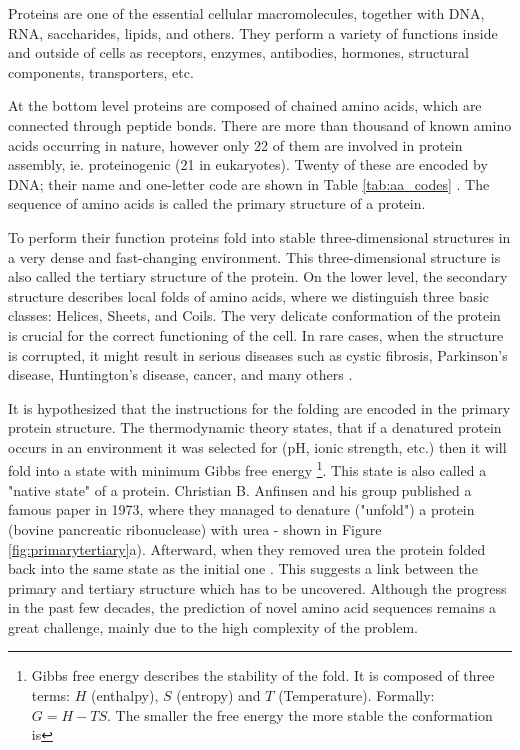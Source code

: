 Proteins are one of the essential cellular macromolecules, together with DNA, RNA, saccharides, lipids, and others.
They perform a variety of functions inside and outside of cells as receptors, enzymes, antibodies, hormones, structural components, transporters, etc. 

At the bottom level proteins are composed of chained amino acids, which are connected through peptide bonds. 
There are more than thousand of known amino acids occurring in nature, however only 22 of them are involved in protein assembly, ie. proteinogenic (21 in eukaryotes). 
Twenty of these are encoded by DNA; their name and one-letter code are shown in Table \ref{tab:aa_codes} \cite{protgenaa}. 
The sequence of amino acids is called the primary structure of a protein.

To perform their function proteins fold into stable three-dimensional structures in a very dense and fast-changing environment.
This three-dimensional structure is also called the tertiary structure of the protein. 
On the lower level, the secondary structure describes local folds of amino acids, where we distinguish three basic classes: Helices, Sheets, and Coils.
The very delicate conformation of the protein is crucial for the correct functioning of the cell.
In rare cases, when the structure is corrupted, it might result in serious diseases such as cystic fibrosis, Parkinson's disease, Huntington's disease, cancer, and many others \cite{protein_misfolding_diseases}.

It is hypothesized that the instructions for the folding are encoded in the primary protein structure. 
The thermodynamic theory states, that if a denatured protein occurs in an environment it was selected for (pH, ionic strength, etc.) then it will fold into a state with minimum Gibbs free energy \footnote{Gibbs free energy describes the stability of the fold. It is composed of three terms: $H$ (enthalpy), $S$ (entropy) and $T$ (Temperature). Formally: $G = H - TS$. The smaller the free energy the more stable the conformation is}.
This state is also called a "native state" of a protein. 
Christian B. Anfinsen and his group published a famous paper in 1973, where they managed to denature ("unfold") a protein (bovine pancreatic ribonuclease) with urea - shown in Figure \ref{fig:primarytertiary}a). 
Afterward, when they removed urea the protein folded back into the same state as the initial one \cite{anfinsen}. 
This suggests a link between the primary and tertiary structure which has to be uncovered. 
Although the progress in the past few decades, the prediction of novel amino acid sequences remains a great challenge, mainly due to the high complexity of the problem.

